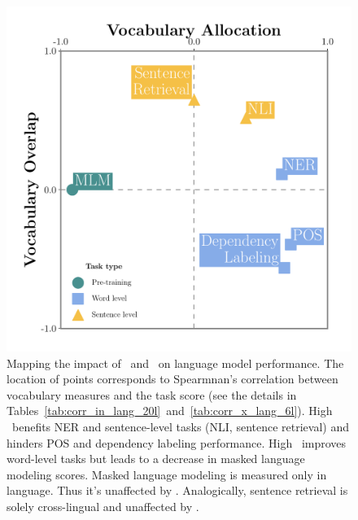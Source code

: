 \begin{figure}[tb!]
    \centering
    \includegraphics[width=\linewidth]{figures/Schwartz_camread_.pdf}

    \caption{Mapping the impact of \va~and \vo~on language model performance. The location of points corresponds to Spearmnan's correlation between vocabulary measures and the task score (see the details in Tables~\ref{tab:corr_in_lang_20l}~and~\ref{tab:corr_x_lang_6l}). High \vo~benefits NER and sentence-level tasks (NLI, sentence retrieval) and hinders POS and dependency labeling performance. High \va~improves word-level tasks but leads to a decrease in masked language modeling scores. 
    Masked language modeling is measured only in language. Thus it's unaffected by \vo. Analogically, sentence retrieval is solely cross-lingual and unaffected by \va.}
    \label{fig:schwartz}
\end{figure}